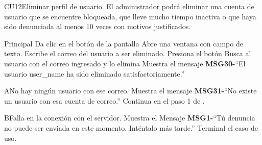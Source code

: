 \begin{UseCase}{CU12}{Eliminar perfil de usuario.}{
		El administrador podrá eliminar una cuenta de usuario que se encuentre bloqueada, que lleve mucho tiempo inactiva o que haya sido denunciada al menos 10 veces con motivos justificados.
	}
		
	\end{UseCase}

	\begin{UCtrayectoria}{Principal}
		\UCpaso[\UCactor] Da clic en el botón  de la pantalla 
		\UCpaso Abre una ventana con campo de texto.
		\UCpaso[\UCactor] Escribe el correo del usuario a ser eliminado.
		\UCpaso[\UCactor] Presiona el botón 
		\UCpaso Busca al usuario con el correo ingresado y lo elimina  
		\UCpaso Muestra el mensaje {\bf MSG30-}``El usuario user\_name ha sido eliminado satisfactoriamente.''
	\end{UCtrayectoria}

		\begin{UCtrayectoriaA}{A}{No hay ningún usuario con ese correo.}
			\UCpaso Muestra el mensaje {\bf MSG31-}``No existe un usuario con esa cuenta de correo.''
			\UCpaso Continua en el paso 1 de .
		\end{UCtrayectoriaA}
		
		\begin{UCtrayectoriaA}{B}{Falla en la conexión con el servidor.}
			\UCpaso Muestra el Mensaje {\bf MSG1-}``Tú denuncia no puede ser enviada en este momento. Inténtalo más tarde.''
			\UCpaso Terminal el caso de uso.
		\end{UCtrayectoriaA}
		
		
		
